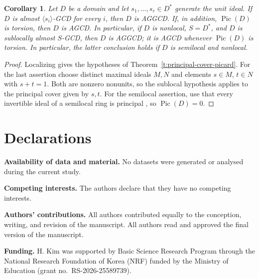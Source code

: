\documentclass[11pt]{amsart}
\newtheorem{corollary}[theorem]{Corollary}
\theoremstyle{definition}
\theoremstyle{remark}
\DeclareMathOperator{\Pic}{Pic}
\begin{document}
\begin{corollary}\label{c:cyclic-cover}
Let $D$ be a domain and let $s_1,\ldots,s_r\in D^\ast$ generate
the unit ideal. If $D$ is almost $\langle s_i\rangle$-GCD for
every $i$, then $D$ is AGGCD. If, in addition, $\Pic(D)$ is
torsion, then $D$ is AGCD.
In particular, if $D$ is nonlocal, $S=D^\ast$, and $D$ is
sublocally almost $S$-GCD, then $D$ is AGGCD; it is AGCD
whenever $\Pic(D)$ is torsion. In particular, the latter conclusion
holds if $D$ is semilocal and nonlocal.
\end{corollary}

\begin{proof}
Localizing gives the hypotheses of
Theorem~\ref{t:principal-cover-picard}.
For the last assertion choose distinct maximal ideals
$M,N$ and elements $s\in M$, $t\in N$ with $s+t=1$.
Both are nonzero nonunits, so the sublocal hypothesis applies
to the principal cover given by $s,t$. For the semilocal assertion,
use that every invertible ideal of a semilocal ring is principal
\cite{Gilmer}, so $\Pic(D)=0$.
\end{proof}
\section*{Declarations}
\noindent\textbf{Availability of data and material.}
No datasets were generated or analysed during the current study.

\smallskip
\noindent\textbf{Competing interests.}
The authors declare that they have no competing interests.

\smallskip
\noindent\textbf{Authors' contributions.}
All authors contributed equally to the conception, writing, and revision
of the manuscript. All authors read and approved the final version
of the manuscript.

\smallskip
\noindent\textbf{Funding.}
H. Kim was supported by Basic Science Research Program through the
National Research Foundation of Korea (NRF) funded by the Ministry
of Education (grant no.~RS-2026-25589739).
\end{document}
